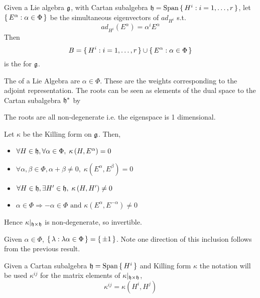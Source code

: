 \documentclass{article}
\begin{document}
\begin{definition}
	Given a Lie algebra $\mathfrak{g}$, with Cartan subalgebra $\mathfrak{h}=\operatorname{Span}\set{ H^i : i=1,\dots,r }$, let $\set{  E^\alpha : \alpha\in\Phi  }$ be the simultaneous eigenvectors of $ad_{H^i}$ s.t. 
	\[
	ad_{H^i}\left(E^\alpha \right)=\alpha^i E^\alpha
	\]
	Then 
	\[
	B=\set{  H^i : i=1,\dots,r } \cup \set{  E^\alpha : \alpha\in\Phi  }
	\]
	is the  for $\mathfrak{g}$.
\end{definition}



\begin{definition}[Roots]
	The  of a Lie Algebra are $\alpha\in\Phi$.
	These are the weights corresponding to the adjoint representation. The roots can be seen as elements of the dual space to the Cartan subalgebra $\mathfrak{h}^\ast$ by 
\end{definition}

\begin{fact}
	The roots are all non-degenerate i.e. the eigenspace is 1 dimensional. 
\end{fact}

\begin{theorem}
	Let $\kappa$ be the Killing form on $\mathfrak{g}$. Then, 
	\begin{itemize}
		\item $\forall H\in\mathfrak{h}, \forall\alpha\in\Phi, \; \kappa\left(H,E^\alpha\right)=0 $
		\item $\forall\alpha,\beta\in\Phi, \alpha+\beta\neq0, \; \kappa\left(E^\alpha,E^\beta\right)=0$
		\item $\forall H\in\mathfrak{h}, \exists H^\prime\in\mathfrak{h}, \; \kappa\left(H,H^\prime\right)\neq0$
		\item $\alpha\in\Phi \Rightarrow -\alpha\in\Phi \text{ and } \kappa\left(E^\alpha,E^{-\alpha}\right)\neq0$
	\end{itemize}
	Hence $\kappa|_{\mathfrak{h}\times\mathfrak{h}}$ is non-degenerate, so invertible. 
\end{theorem}

\begin{fact}
	Given $\alpha\in\Phi$, $\set{  \lambda : \lambda\alpha\in\Phi  } = \set{  \pm1  }$. Note one direction of this inclusion follows from the previous result. 
\end{fact}

\begin{definition}[$\kappa^{ij}$]
	Given a Cartan subalgebra $\mathfrak{h}=\operatorname{Span}\set{ H^i }$ and Killing form $\kappa$ the notation will be used $\kappa^{ij}$ for the matrix elements of $\kappa |_{\mathfrak{h}\times\mathfrak{h}}$,
	\[
	\kappa^{ij}=\kappa(H^i, H^j)
	\]
\end{definition}
\end{document}
